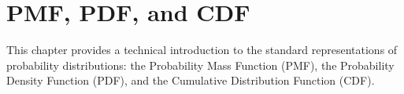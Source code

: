 \chapter{PMF, PDF, and CDF}

This chapter provides a technical introduction to the standard representations of probability distributions: the Probability Mass Function (PMF), the Probability Density Function (PDF), and the Cumulative Distribution Function (CDF).

